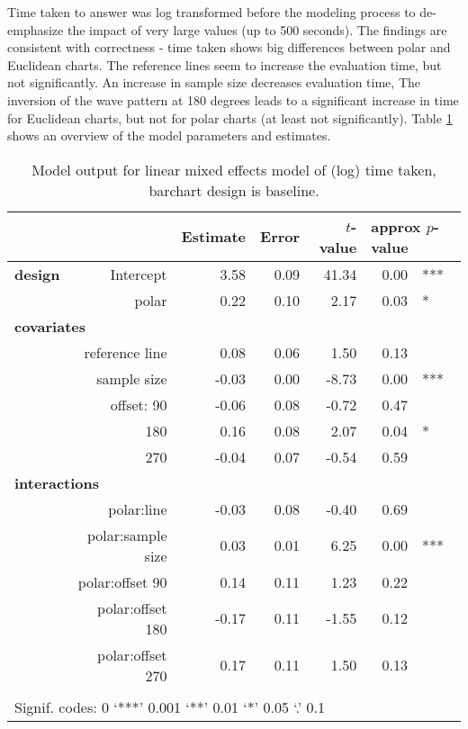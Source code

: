 Time taken to answer was log transformed before the modeling process to de-emphasize the impact of very large values (up to 500 seconds). The findings are consistent with correctness - time taken shows big differences between polar and Euclidean charts. 
The reference lines seem to increase the evaluation time, but not significantly. An increase in sample size decreases evaluation time, The inversion of the wave pattern at 180 degrees leads to a significant increase in time for Euclidean charts, but not for polar charts (at least not significantly). Table \ref{tbl:time} shows an overview of the model parameters and estimates.

\begin{table}[ht]
\begin{center}
\resizebox{\linewidth}{!} {
\begin{tabular}{lrrrrrl}
  \hline
& & Estimate & Error & $t$-value & \multicolumn{2}{l}{approx $p$-value} \\   \hline
\bf design & Intercept & 3.58 & 0.09 & 41.34 & 0.00 & ***\\ 
&  polar & 0.22 & 0.10 & 2.17 & 0.03 & * \\ [2pt]
\multicolumn{2}{l}{\bf covariates}\\
&reference line & 0.08 & 0.06 & 1.50 & 0.13 \\ [1pt]
 & sample size & -0.03 & 0.00 & -8.73 & 0.00 & ***\\ [1pt]
&  offset: 90 & -0.06 & 0.08 & -0.72 & 0.47 \\ 
& 180 & 0.16 & 0.08 & 2.07 & 0.04 & *\\ 
&  270 & -0.04 & 0.07 & -0.54 & 0.59 \\ [2pt]
\multicolumn{2}{l}{\bf interactions}\\
&  polar:line & -0.03 & 0.08 & -0.40 & 0.69 \\ [1pt]
&    polar:sample size & 0.03 & 0.01 & 6.25 & 0.00 & ***\\ [1pt]
&    polar:offset 90 & 0.14 & 0.11 & 1.23 & 0.22 \\ 
&    polar:offset 180 & -0.17 & 0.11 & -1.55 & 0.12 \\ 
&    polar:offset 270 & 0.17 & 0.11 & 1.50 & 0.13 \\ 
   \hline
\\[-5pt]
   \multicolumn{5}{l}{Signif. codes:  0 `***' 0.001 `**' 0.01 `*' 0.05 `.' 0.1}
\end{tabular}}
\end{center}
\caption{\label{tbl:time} Model output for linear mixed effects model of (log) time taken, barchart design is baseline. }
\end{table}

